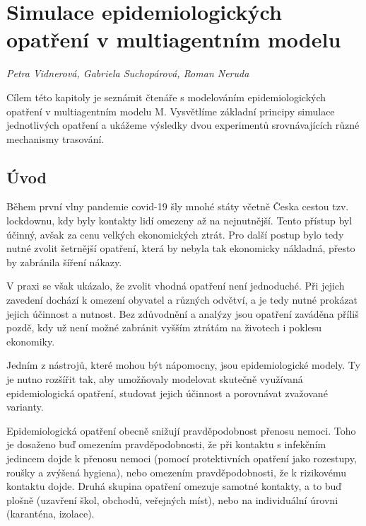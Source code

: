 
\chapter[Simulace v multiagentním modelu]{Simulace epidemiologických opatření v multiagentním modelu}
\label{Evaluace_politik}

\textit{Petra Vidnerová, Gabriela Suchopárová, Roman Neruda}
\vspace{15mm}

Cílem této kapitoly je seznámit čtenáře s modelováním
epidemiologických opatření v multiagentním modelu M. Vysvětlíme
základní principy simulace jednotlivých opatření a ukážeme výsledky
dvou experimentů srovnávajících různé mechanismy trasování.


\section*{Úvod}

Během první vlny pandemie covid-19 šly mnohé státy včetně Česka
cestou tzv. lockdownu, kdy byly kontakty lidí omezeny až na
nejnutnější. Tento přístup byl účinný, avšak za cenu velkých
ekonomických ztrát. Pro další postup bylo tedy nutné zvolit šetrnější
opatření, která by nebyla tak ekonomicky nákladná, přesto by zabránila
šíření nákazy.

V praxi se však ukázalo, že zvolit vhodná opatření není
jednoduché. Při jejich zavedení dochází k omezení obyvatel a různých
odvětví, a je tedy nutné prokázat jejich účinnost a nutnost. Bez
zdůvodnění a analýzy jsou opatření zaváděna příliš pozdě, kdy už není
možné zabránit vyšším ztrátám na životech i poklesu ekonomiky.

Jedním z nástrojů, které mohou být nápomocny, jsou epidemiologické
modely. Ty je nutno rozšířit tak, aby umožňovaly modelovat skutečně
využívaná epidemiologická opatření, studovat jejich účinnost a
porovnávat zvažované varianty.

Epidemiologická opatření obecně snižují pravděpodobnost přenosu nemoci. Toho
je dosaženo buď omezením pravděpodobnosti, že při kontaktu s infekčním jedincem
dojde k přenosu nemoci (pomocí protektivních opatření jako rozestupy, roušky
a zvýšená hygiena), nebo omezením pravděpodobnosti, že k rizikovému kontaktu
dojde. Druhá skupina opatření omezuje samotné kontakty, a to buď plošně
(uzavření škol, obchodů, veřejných míst), nebo na individuální úrovni
(karanténa, izolace).

